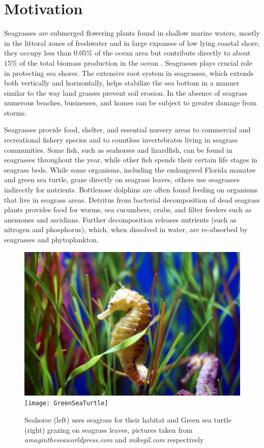 \documentclass[12pt]{report}   %
\begin{document}
\section{Motivation}
Seagrasses are submerged flowering plants found in shallow marine waters, mostly in the littoral zones of freshwater and in large expanses of low lying coastal shore, they occupy less than $0.05\%$ of the ocean area \cite{green2003world} but contribute directly to about $15\%$ of the total biomass production in the ocean \cite{duarte1999}. Seagrasses plays crucial role in protecting sea shores. The extensive root system in seagrasses, which extends both vertically and horizontally, helps stabilize the sea bottom in a manner similar to the way land grasses prevent soil erosion. In the absence of seagrass numerous beaches, businesses, and homes can be subject to greater damage from storms.

Seagrasses provide food, shelter, and essential nursery areas to commercial and recreational fishery species and to countless invertebrates living in seagrass communities.
Some fish, such as seahorses and lizardfish, can be found in seagrasses throughout the year, while other fish spends their certain life stages in seagrass beds. While some organisms, including the endangered Florida manatee and green sea turtle, graze directly on seagrass leaves, others use seagrasses indirectly for nutrients. Bottlenose dolphins are often found feeding on organisms that live in seagrass areas. Detritus from bacterial decomposition of dead seagrass plants provides food for worms, sea cucumbers, crabs, and filter feeders such as anemones and ascidians. Further decomposition releases nutrients (such as nitrogen and phosphorus), which, when dissolved in water, are re-absorbed by seagrasses and phytoplankton.
\begin{figure}
\centerline{ \includegraphics[scale=1.45]{SeaHorse} \texttt{[image: GreenSeaTurtle]} }
\caption{Seahorse (left) uses seagrass for their habitat and Green sea turtle (right) grazing on seagrass leaves, pictures taken from \textit{amagintheseaworldpress.com} and  \textit{mikegil.com} respectively  }
\end{figure}
\end{document}
